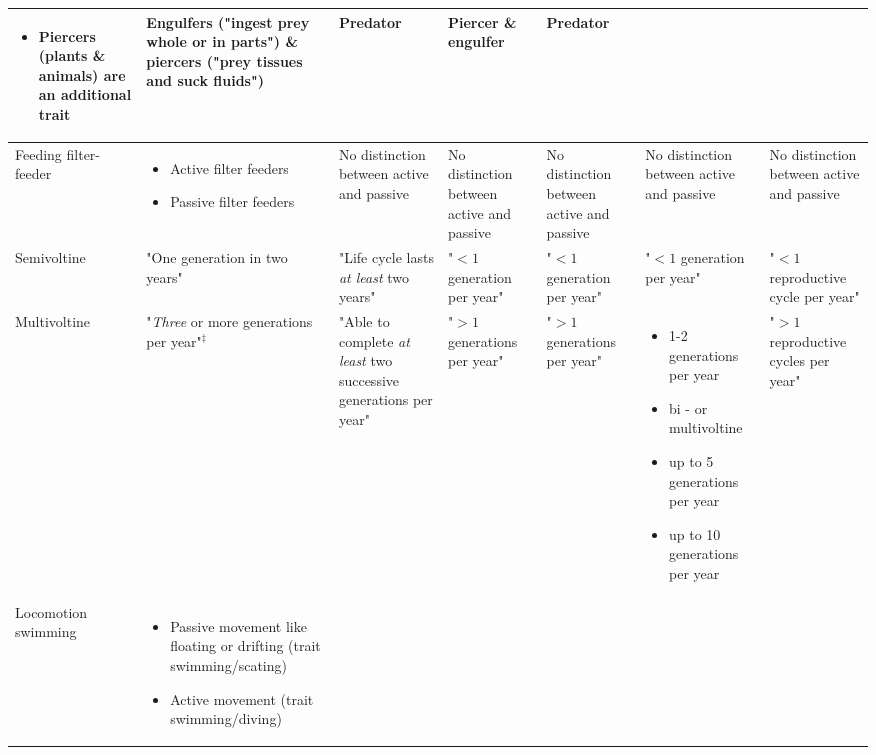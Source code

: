 \documentclass[12pt]{article}
\begin{document}
\begin{landscape}
\begin{longtable}{m{2cm}|m{3.25cm}|m{3.2cm}|m{3.1cm}|m{2.9cm}|m{3.4cm}|m{2.4cm}}
\begin{itemize}
            \item Piercers (plants \& animals) are an additional trait
        \end{itemize} & %
        Engulfers ("ingest prey whole or in parts") \& 
        piercers ("prey tissues and suck fluids") & 
        Predator &
        Piercer \& engulfer &
        Predator
        \\ 
        \midrule
        Feeding filter-feeder & 
        \begin{itemize}
            \item Active filter feeders
            \item Passive filter feeders
        \end{itemize} &
        No distinction between active and passive &
        No distinction between active and passive &
        No distinction between active and passive &
        No distinction between active and passive &
        No distinction between active and passive
        \\
        \toprule[.1em]
        Semivoltine & 
        "One generation in two years" & 
        "Life cycle lasts \textit{at least} two years" & 
        "$< 1$ generation per year" & 
        "$< 1$ generation per year" & 
        "$< 1$ generation per year" & 
        "$< 1$ reproductive cycle per year"
        \\
        \midrule
        Multi\-voltine & 
        "\textit{Three} or more generations per year"$^{\ddagger}$ & 
        "Able to complete \textit{at least} two successive generations per year" &
        "$> 1$ generations per year" &
        "$> 1$ generations per year" & 
        \begin{itemize}
            \item 1-2 generations per year
            \item bi - or multivoltine
            \item up to 5 generations per year
            \item up to 10 generations per year
        \end{itemize}
        & 
        "$> 1$ reproductive cycles per year"
        \\
        \toprule[.1em]
        Locomotion swimming & 
        \begin{itemize}
            \item Passive movement like floating or drifting (trait swimming/scating)
            \item Active movement (trait swimming/diving)

\end{itemize}
\end{longtable}
\end{landscape}
\end{document}
